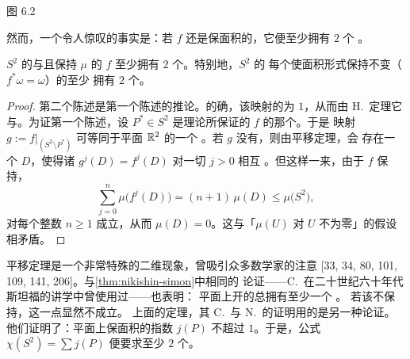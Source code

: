 \noindent\begin{minipage}{\linewidth}
\centering
{}

图 6.2
\end{minipage}

然而，一个令人惊叹的事实是：若 $f$ 还是保面积的，它便至少拥有 $2$ 个%
\trFixedPoint。

\begin{theorem}\label{thm:nikishin-simon}
$S^{2}$ 的与\trIdentityMap\trHomotopic{}且保持\trRegular\trMeasure{} $\mu$%
的\trHomeomorphism{} $f$ 至少拥有 $2$ 个\trFixedPoint。特别地，$S^{2}$ 的%
每个使面积形式保持不变（$f^{*}\omega=\omega$）的\trDiffeomorphism{}至少%
拥有 $2$ 个\trFixedPoint。
\end{theorem}

\begin{proof}
第二个陈述是第一个陈述的推论。的确，该映射的\trDegree{}为 $1$，从而由%
H.~\trHopf{}定理它与\trIdentityMap\trHomotopic。为证第一个陈述，设%
$P^{*}\in S^{2}$ 是\trLefschetz{}理论所保证的 $f$ 的那个\trFixedPoint。于是%
映射 $g:=f\bigl|_{(S^{2}\setminus P^{*})}$ 可等同于平面 $\mathbb{R}^{2}$ 的一个%
\trHomeomorphism。若 $g$ 没有\trFixedPoint，则由\trBrouwer{}平移定理，会%
存在一个\trOpenSet{} $D$，使得诸 $g^{j}(D)=f^{j}(D)$ 对一切 $j>0$ 相互%
\trDisjoint。但这样一来，由于 $f$ 保持\trMeasure，
\[
\sum_{j=0}^{n}\mu\bigl(f^{j}(D)\bigr)=(n+1)\,\mu(D)\leq\mu\bigl(S^{2}\bigr),
\]
对每个整数 $n\geq1$ 成立，从而 $\mu(D)=0$。这与「$\mu(U)$ 对\trOpenSet{}%
$U$ 不为零」的假设相矛盾。
\end{proof}

\trBrouwer{}平移定理是一个非常特殊的二维现象，曾吸引众多数学家的注意%
[33, 34, 80, 101, 109, 141, 206]。与\cref{thm:nikishin-simon}中相同的%
论证——C.~\trLoewner{}在二十世纪六十年代斯坦福的讲学中曾使用过——也表明：%
平面上开\trDisc{}的\trMeasurePreserving\trHomeomorphism{}总拥有至少一个%
\trFixedPoint。%
若该\trHomeomorphism{}不保持\trRegular\trMeasure，这一点显然不成立。%
上面的定理，其 C.~\trSimon [200] 与 N.~\trNikishin [169] 的证明用的是另一种论证。%
他们证明了：平面上保面积\trDiffeomorphism{}的\trFixedPoint{}指数 $j(P)$%
不超过 $1$。于是，\trFixedPoint{}公式 $\chi(S^{2})=\sum j(P)$ 便要求至少%
$2$ 个\trFixedPoint。

